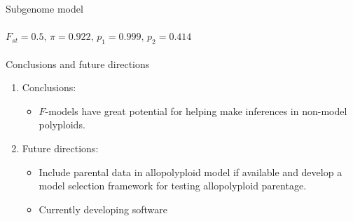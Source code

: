 \documentclass[presentation,sansserif]{beamer}
\begin{document}
{  %
\begin{frame}[c,plain]{Subgenome model}
	\framesubtitle{$F_{st}=0.5,\, \pi=0.922,\, p_1=0.999,\, p_2=0.414$}
	\begin{center}
	\end{center}
\end{frame}
}


\begin{frame}[t]{Conclusions and future directions}
	\pause
	\fontsize{10pt}{10}\selectfont
	\begin{enumerate}
		\item{Conclusions:}
		\setlength\itemsep{0.1in}
		\begin{itemize}
			\setlength\itemsep{0.1in}
			\item $F$-models have great potential for helping make inferences in non-model polyploids.
			\vspace{0.2in}
		\end{itemize}
		\pause
		\item{Future directions:}
		\setlength\itemsep{0.1in}
		\begin{itemize}
		\setlength\itemsep{0.1in}
			\item Include parental data in allopolyploid model if available and develop a model selection framework for testing allopolyploid parentage. \pause
			\item Currently developing software 
		\end{itemize}
	\end{enumerate}

\end{frame}
\end{document}
